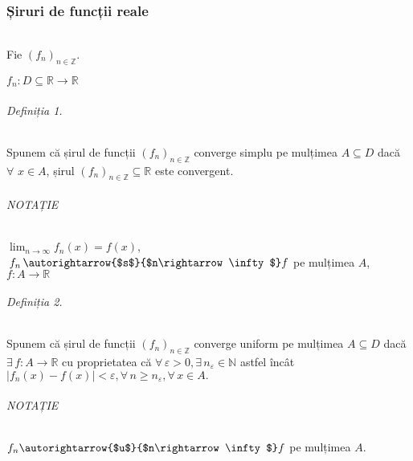 \part{}

\section{Șiruri de funcții reale}

\paragraph{}
Fie $(f_{n})_{n \in \mathbb{Z}}.$

$f_{n}: D \subseteq \mathbb{R} \rightarrow \mathbb{R}$

\paragraph{Definiția 1.}
Spunem că șirul de funcții $(f_{n})_{n \in \mathbb{Z}}$ converge simplu pe
mulțimea $A \subseteq D$ dacă $\forall \, \, x \in A$, șirul
$(f_{n})_{n \in \mathbb{Z}} \subseteq \mathbb{R}$ este convergent.

\paragraph{NOTAȚIE}
$\displaystyle\lim_{n \rightarrow \infty} f_{n}(x) = f(x)$,
$\, f_n \, \autorightarrow{$s$}{$n\rightarrow\infty$} f$
pe mulțimea $A$, $f: A \rightarrow \mathbb{R}$

\paragraph{Definiția 2.}

Spunem că șirul de funcții $(f _{n} ) _{ n\in\mathbb{Z} }$ converge uniform
pe mulțimea $A \subseteq D$ dacă $\exists \, f:A \rightarrow \mathbb{R}$ cu
proprietatea că $\forall \, \varepsilon>0, \exists \, n_{\varepsilon} \in
\mathbb{N}$ astfel încât $\lvert f_{n}(x) - f(x) \rvert < \varepsilon,
\forall \, n \geq n_{\varepsilon}, \forall \, x \in A.$

\paragraph{NOTAȚIE}
$f_{n} \autorightarrow{$u$}{$n\rightarrow\infty$} f$ pe mulțimea $A$.


